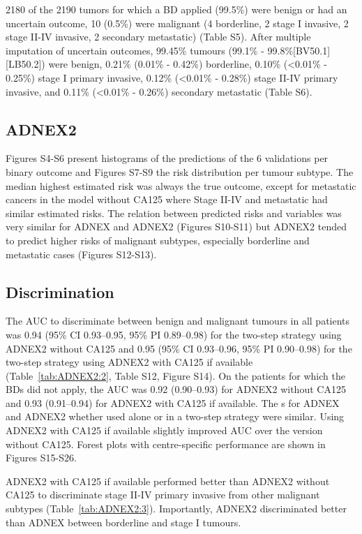 2180 of the 2190 tumors for which a BD applied (99.5\%) were benign or had an uncertain outcome, 10 (0.5\%) were malignant (4 borderline, 2 stage I invasive, 2 stage II-IV invasive, 2 secondary metastatic) (Table S5). After multiple imputation of uncertain outcomes, 99.45\% tumours (99.1\% - 99.8\%[BV50.1][LB50.2]) were benign, 0.21\% (0.01\% - 0.42\%) borderline, 0.10\% (<0.01\% - 0.25\%) stage I primary invasive, 0.12\% (<0.01\% - 0.28\%) stage II-IV primary invasive, and 0.11\% (<0.01\% - 0.26\%) secondary metastatic (Table S6). 

\subsection{ADNEX2}

Figures S4-S6 present histograms of the predictions of the 6 validations per binary outcome and Figures S7-S9 the risk distribution per tumour subtype. The median highest estimated risk was always the true outcome, except for metastatic cancers in the model without CA125 where Stage II-IV and metastatic had similar estimated risks. The relation between predicted risks and variables was very similar for ADNEX and ADNEX2 (Figures S10-S11) but ADNEX2 tended to predict higher risks of malignant subtypes, especially borderline and metastatic cases (Figures S12-S13).  

\subsection{Discrimination}

The \gls{AUC} to discriminate between benign and malignant tumours in all patients was 0.94 (95\% \gls{CI} 0.93--0.95, 95\% \gls{PI} 0.89--0.98) for the two-step strategy using ADNEX2 without \gls{CA125} and 0.95 (95\% \gls{CI} 0.93--0.96, 95\% \gls{PI} 0.90--0.98) for the two-step strategy using ADNEX2 with \gls{CA125} if available (Table~\ref{tab:ADNEX2:2}, Table S12, Figure S14). On the patients for which the \glspl{BD} did not apply, the \gls{AUC} was 0.92 (0.90--0.93) for ADNEX2 without \gls{CA125} and 0.93 (0.91--0.94) for ADNEX2 with \gls{CA125} if available. The s for \gls{ADNEX} and ADNEX2 whether used alone or in a two-step strategy were similar. Using ADNEX2 with \gls{CA125} if available slightly improved \gls{AUC} over the version without \gls{CA125}. Forest plots with centre-specific performance are shown in Figures S15-S26. 

ADNEX2 with \gls{CA125} if available performed better than ADNEX2 without \gls{CA125} to discriminate stage II-IV primary invasive from other malignant subtypes (Table~\ref{tab:ADNEX2:3}). Importantly, ADNEX2 discriminated better than \gls{ADNEX} between borderline and stage I tumours.

